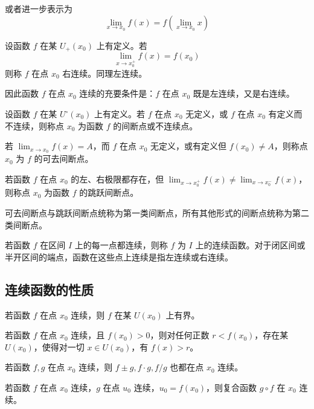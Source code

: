 或者进一步表示为
$$\lim_{x\to x_0}f(x) = f\left(\lim_{x\to x_0}x\right)$$

\begin{definition}
    设函数 $f$ 在某 $U_+(x_0)$ 上有定义。若
    $$\lim_{x\to x_0^+}f(x) = f(x_0)$$
    则称 $f$ 在点 $x_0$ 右连续。同理左连续。
\end{definition}

因此函数 $f$ 在点 $x_0$ 连续的充要条件是：$f$ 在点 $x_0$ 既是左连续，又是右连续。

\begin{definition}[间断点]
    设函数 $f$ 在某 $U^\circ(x_0)$ 上有定义。若 $f$ 在点 $x_0$ 无定义，或 $f$ 在点 $x_0$ 有定义而不连续，则称点 $x_0$ 为函数 $f$ 的间断点或不连续点。
\end{definition}

若 $\displaystyle\lim_{x\to x_0}f(x)=A$，而 $f$ 在点 $x_0$ 无定义，或有定义但 $f(x_0)\ne A$，则称点 $x_0$ 为 $f$ 的可去间断点。

若函数 $f$ 在点 $x_0$ 的左、右极限都存在，但 $\displaystyle\lim_{x\to x_0^+}f(x) \ne \lim_{x\to x_0^-}f(x)$，则称点 $x_0$ 为函数 $f$ 的跳跃间断点。

可去间断点与跳跃间断点统称为第一类间断点，所有其他形式的间断点统称为第二类间断点。

若函数 $f$ 在区间 $I$ 上的每一点都连续，则称 $f$ 为 $I$ 上的连续函数。对于闭区间或半开区间的端点，函数在这些点上连续是指左连续或右连续。

\subsection{连续函数的性质}

\begin{theorem}[局部有界性]
    若函数 $f$ 在点 $x_0$ 连续，则 $f$ 在某 $U(x_0)$ 上有界。
\end{theorem}

\begin{theorem}[局部保号性]
    若函数 $f$ 在点 $x_0$ 连续，且 $f(x_0)>0$，则对任何正数 $r<f(x_0)$，存在某 $U(x_0)$，使得对一切 $x\in U(x_0)$，有 $f(x)>r$。
\end{theorem}

\begin{theorem}[四则运算]
    若函数 $f,g$ 在点 $x_0$ 连续，则 $f\pm g,f\cdot g,f/g$ 也都在点 $x_0$ 连续。
\end{theorem}

\begin{theorem}
    若函数 $f$ 在点 $x_0$ 连续，$g$ 在点 $u_0$ 连续，$u_0=f(x_0)$，则复合函数 $g\circ f$ 在 $x_0$ 连续。
\end{theorem}

